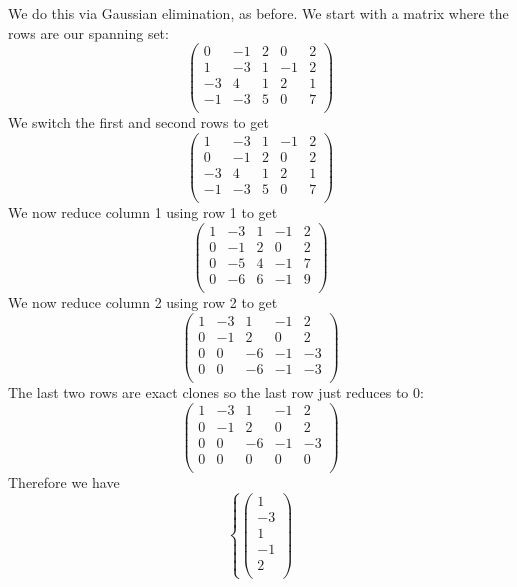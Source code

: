 \documentclass{article}
\newcommand{\chapternumber}{3}
\newenvironment{QandA}{\begin{enumerate}[label=\chapternumber.\arabic*]\bfseries\boldmath}
	{\end{enumerate}}
\newenvironment{answered}{\par\bigskip\normalfont\unboldmath}{}
\begin{document}
\begin{QandA}
\begin{answered}
			We do this via Gaussian elimination, as before. We start with a matrix where the rows are our spanning set:
			\[
			\begin{pmatrix}
				0 & -1 &  2 &  0 &  2 \\
				1 & -3 &  1 & -1 &  2 \\
				-3 &  4 &  1 &  2 &  1 \\
				-1 & -3 &  5 &  0 &  7 \\
			\end{pmatrix}
			\]
			We switch the first and second rows to get
			\[\begin{pmatrix}
				1 & -3 &  1 & -1 &  2 \\
				0 & -1 &  2 &  0 &  2 \\
				-3 &  4 &  1 &  2 &  1 \\
				-1 & -3 &  5 &  0 &  7 \\
			\end{pmatrix}\]
			We now reduce column 1 using row 1 to get
			\[\begin{pmatrix}
				1 & -3 &  1 & -1 &  2 \\
				0 & -1 &  2 &  0 &  2 \\
				0 &  -5 &  4 &  -1 &  7 \\
				0 & -6 &  6 &  -1 &  9 \\
			\end{pmatrix}\]
			We now reduce column 2 using row 2 to get
			\[\begin{pmatrix}
				1 & -3 &  1 & -1 &  2 \\
				0 & -1 &  2 &  0 &  2 \\
				0 &  0 &  -6 &  -1 &  -3 \\
				0 & 0 &  -6 &  -1 &  -3 \\
			\end{pmatrix}\]
			The last two rows are exact clones so the last row just reduces to 0:
			\[\begin{pmatrix}
				1 & -3 &  1 & -1 &  2 \\
				0 & -1 &  2 &  0 &  2 \\
				0 &  0 &  -6 &  -1 &  -3 \\
				0 &  0 &  0 &  0 &  0 \\
			\end{pmatrix}\]
			Therefore we have
			\[
			\left\{
			\begin{pmatrix}
			1 \\ -3 \\  1 \\ -1 \\  2 \\

\end{pmatrix}\]
\end{answered}
\end{QandA}
\end{document}
